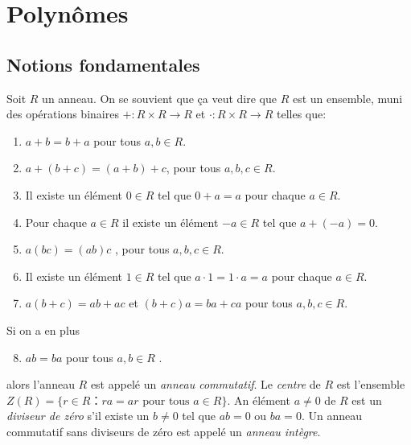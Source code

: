 
\chapter{Polynômes}
\label{cha:polynomes}

\section{Notions fondamentales}
\label{sec:noti-fond}


Soit $R$ un anneau. On se souvient que ça veut dire que  $R$ est un ensemble,  muni des opérations binaires  $+ : R × R → R$  et $⋅: R × R → R$ telles que: 
\begin{enumerate}[(R1)]
\item $a+ b  = b+a$ pour tous     $a,b ∈ R$. \label{R1}
\item $a + (b+c) = (a + b) +c$, pour tous $a,b,c ∈ R$. \label{R2}
\item Il existe un élément $0 ∈R$ tel que $0+a =a$ pour chaque $a ∈R$. \label{R3}
\item Pour chaque $a ∈R$ il existe un élément $-a ∈R$ tel que $a + (-a) = 0$. \label{R4}
\item $a(bc) = (ab) c$ , pour tous $a,b,c ∈ R$. \label{R5}
\item Il existe un élément $1 ∈R$ tel que $a ⋅ 1 = 1 ⋅a = a$ pour chaque $a ∈R$. \label{R6}
\item $a (b+c) = ab + ac$ et $(b+c) a =ba +ca$  pour tous $a,b,c ∈R$.\label{R7} 
\end{enumerate}
Si on a en plus
\begin{enumerate}[(R1)]
  \setcounter{enumi}{7}
\item  $a b = ba$ pour tous $a,b ∈R$ \label{R8}. 
\end{enumerate}
alors l'anneau $R$ est appelé un \emph{anneau commutatif}. Le \emph{centre} de $R$ est l'ensemble $Z(R) = \{ r ∈ R ： ra = ar \text{ pour tous } a ∈ R\}$. 
An élément  $a ≠0$ de $R$ est un \emph{diviseur de zéro} s'il existe un $b≠0$ tel que $ab = 0$ ou $ba = 0$. Un anneau commutatif sans diviseurs de zéro est appelé un \emph{anneau intègre}.  



